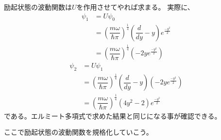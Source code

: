 励起状態の波動関数は$U$を作用させてやれば求まる。
実際に、
\begin{align}
  \psi_1 &= U\psi_0 \\
  &= \left( \dfrac{m\omega}{\hbar\pi} \right)^\frac{1}{4}\left(\dfrac{d}{dy} - y\right)e^{\frac{-y^2}{2}} \\
  &= \left( \dfrac{m\omega}{\hbar\pi} \right)^\frac{1}{4}\left( -2ye^{\frac{-y^2}{2}} \right)
\end{align}
\begin{align}
  \psi_2 &= U\psi_1 \\
  &= \left( \dfrac{m\omega}{\hbar\pi} \right)^\frac{1}{4}\left(\dfrac{d}{dy} - y\right)\left( -2ye^{\frac{-y^2}{2}} \right) \\
  &= \left( \dfrac{m\omega}{\hbar\pi} \right)^\frac{1}{4}\left( 4y^2 -2 \right)e^{\frac{-y^2}{2}}
\end{align}
である。エルミート多項式で求めた結果と同じになる事が確認できる。

ここで励起状態の波動関数を規格化していこう。

